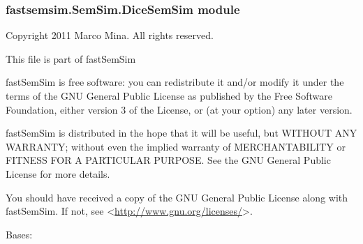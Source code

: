 \documentclass[letterpaper,10pt,english]{sphinxmanual}
\begin{document}
\subsubsection{fastsemsim.SemSim.DiceSemSim module}
\label{fastsemsim.SemSim:module-fastsemsim.SemSim.DiceSemSim}\label{fastsemsim.SemSim:fastsemsim-semsim-dicesemsim-module}
Copyright 2011 Marco Mina. All rights reserved.

This file is part of fastSemSim

fastSemSim is free software: you can redistribute it and/or modify
it under the terms of the GNU General Public License as published by
the Free Software Foundation, either version 3 of the License, or
(at your option) any later version.

fastSemSim is distributed in the hope that it will be useful,
but WITHOUT ANY WARRANTY; without even the implied warranty of
MERCHANTABILITY or FITNESS FOR A PARTICULAR PURPOSE.  See the
GNU General Public License for more details.

You should have received a copy of the GNU General Public License
along with fastSemSim.  If not, see \textless{}\href{http://www.gnu.org/licenses/}{http://www.gnu.org/licenses/}\textgreater{}.

\begin{fulllineitems}
\label{fastsemsim.SemSim:fastsemsim.SemSim.DiceSemSim.DiceSemSim}
Bases: {\hyperref[fastsemsim.SemSim:fastsemsim.SemSim.TermSemSim.TermSemSim]{}}

\begin{fulllineitems}
\label{fastsemsim.SemSim:fastsemsim.SemSim.DiceSemSim.DiceSemSim.IC_based}
\end{fulllineitems}


\begin{fulllineitems}
\label{fastsemsim.SemSim:fastsemsim.SemSim.DiceSemSim.DiceSemSim.SS_type}
\end{fulllineitems}


\begin{fulllineitems}
\label{fastsemsim.SemSim:fastsemsim.SemSim.DiceSemSim.DiceSemSim.extend_annotations}
\end{fulllineitems}


\end{fulllineitems}
\end{document}
